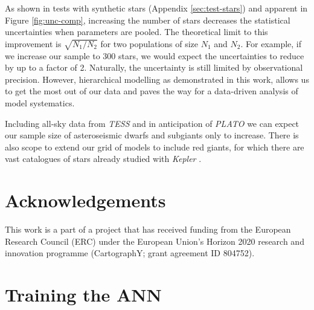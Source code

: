 \documentclass[a4paper,fleqn,usenatbib]{mnras}
\begin{document}
As shown in tests with synthetic stars (Appendix \ref{sec:test-stars}) and apparent in Figure \ref{fig:unc-comp}, increasing the number of stars decreases the statistical uncertainties when parameters are pooled. The theoretical limit to this improvement is $\sqrt{N_1 / N_2}$ for two populations of size $N_1$ and $N_2$. For example, if we increase our sample to 300 stars, we would expect the uncertainties to reduce by up to a factor of 2. Naturally, the uncertainty is still limited by observational precision. However, hierarchical modelling as demonstrated in this work, allows us to get the most out of our data and paves the way for a data-driven analysis of model systematics.

Including all-sky data from \emph{TESS} and in anticipation of \emph{PLATO} \citep{Rauer.Catala.ea2014} we can expect our sample size of asteroseismic dwarfs and subgiants only to increase. There is also scope to extend our grid of models to include red giants, for which there are vast catalogues of stars already studied with \emph{Kepler} \citep{Pinsonneault.Elsworth.ea2018}.

\section*{Acknowledgements}


This work is a part of a project that has received funding from the European Research Council (ERC) under the European Union’s Horizon 2020 research and innovation programme (CartographY; grant agreement ID 804752).








\appendix

\section{Training the ANN}\label{sec:apx-train}
\end{document}
